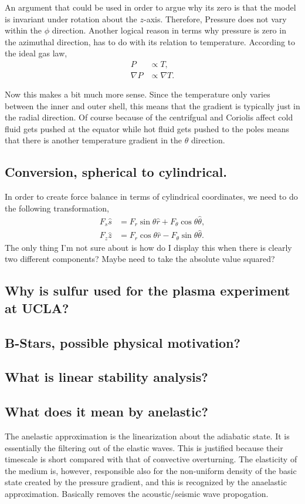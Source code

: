 An argument that could be used in order to argue why its zero is that the model is invariant under rotation about the $z$-axis. Therefore, Pressure does not vary within the $\phi$ direction. Another logical reason in terms why pressure is zero in the azimuthal direction, has to do with its relation to temperature. According to the ideal gas law, 
\begin{align}
	P &\propto T, \\
	\nabla P &\propto \nabla T.
\end{align} 

Now this makes a bit much more sense. Since the temperature only varies between the inner and outer shell, this means that the gradient is typically just in the radial direction. Of course because of the centrifgual and Coriolis affect cold fluid gets pushed at the equator while hot fluid gets pushed to the poles means that there is another temperature gradient in the $\theta$ direction.  


\subsection{Conversion, spherical to cylindrical.}
In order to create force balance in terms of cylindrical coordinates, we need to do the following transformation, 
\begin{align}
	F_s \hat{s} &= F_r \sin{\theta} \hat{r} + F_{\theta} \cos{\theta} \hat{\theta}, \\
	F_z \hat{z} &= F_r \cos{\theta} \hat{r} - F_{\theta} \sin{\theta} \hat{\theta}.
\end{align}
The only thing I'm not sure about is how do I display this when there is clearly two different components? Maybe need to take the absolute value squared? 

\subsection{Why is sulfur used for the plasma experiment at UCLA?}

\subsection{B-Stars, possible physical motivation?}

\subsection{What is linear stability analysis?}

\subsection{What does it mean by anelastic?}
The anelastic approximation is the linearization about the adiabatic state. It is essentially the filtering out of the elastic waves. This is justified because their timescale is short compared with that of convective overturning. The elasticity of the medium is, however, responsible also for the non-uniform density of the basic state created by the pressure gradient, and this is recognized by the anaelastic approximation. Basically removes the acoustic/seismic wave propogation.   

